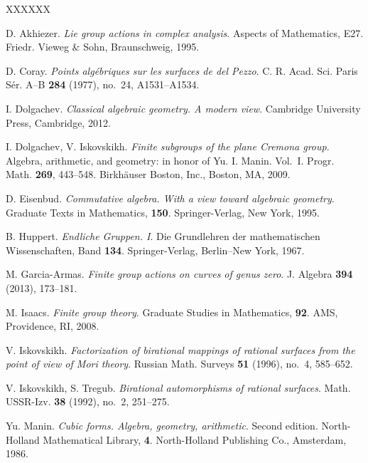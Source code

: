 \documentclass[12pt]{amsart}
\theoremstyle{definition}
\theoremstyle{remark}
\begin{document}
\begin{thebibliography}{XXXXXX}

D. Akhiezer. \emph{Lie group actions in complex analysis}.
Aspects of Mathematics, E27. Friedr. Vieweg \& Sohn, Braunschweig, 1995.



D. Coray. \emph{Points alg\'ebriques sur les surfaces de del Pezzo}.
C. R. Acad. Sci. Paris Sér. A--B \textbf{284} (1977), no.~24, {\rm A}1531--{\rm A}1534.

I. Dolgachev. \emph{Classical algebraic geometry. A modern view}.
Cambridge University Press, Cambridge, 2012.

I. Dolgachev, V. Iskovskikh.
\emph{Finite subgroups of the plane Cremona group}.
Algebra, arithmetic, and geometry:
in honor of Yu. I. Manin. Vol.~I. Progr. Math. \textbf{269}, 443--548.
Birkh\"{a}user Boston, Inc., Boston, MA, 2009.


D. Eisenbud. \emph{Commutative algebra. With a view toward algebraic geometry}.
Graduate Texts in Mathematics, \textbf{150}. Springer-Verlag, New York, 1995.


B. Huppert. \emph{Endliche Gruppen. I}.
Die Grundlehren der mathematischen Wissenschaften, Band \textbf{134}.
Springer-Verlag, Berlin--New York, 1967.

M. Garcia-Armas. \emph{Finite group actions on curves of genus zero}.
J. Algebra \textbf{394} (2013), 173--181.

M. Isaacs. \emph{Finite group theory}.
Graduate Studies in Mathematics, \textbf{92}.
AMS, Providence, RI, 2008.

V. Iskovskikh. \emph{Factorization of birational mappings of rational
surfaces from the point of view of Mori theory}.
Russian Math. Surveys \textbf{51} (1996), no.~4, 585--652.

V. Iskovskikh, S. Tregub. \emph{Birational automorphisms of rational surfaces}.
Math. USSR-Izv. \textbf{38} (1992), no.~2, 251--275.


Yu. Manin. \emph{Cubic forms. Algebra, geometry, arithmetic}.
Second edition. North-Holland Mathematical Library, \textbf{4}.
North-Holland Publishing Co., Amsterdam, 1986.


\end{thebibliography}
\end{document}
